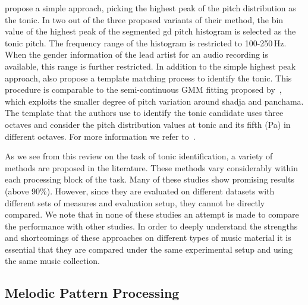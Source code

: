 \cite{Ashwin_Istanbul2012} propose a simple approach, picking the highest peak of the pitch distribution as the tonic. In two out of the three proposed variants of their method, the bin value of the highest peak of the segmented \gls{gd} pitch histogram is selected as the tonic pitch. The frequency range of the histogram is restricted to 100-250\,Hz. When the gender information of the lead artist for an audio recording is available, this range is further restricted. In addition to the simple highest peak approach, \cite{Ashwin_Istanbul2012} also propose a template matching process to identify the tonic. This procedure is comparable to the semi-continuous GMM fitting proposed by~\cite{ranjani2011carnatic}, which exploits the smaller degree of pitch variation around \gls{shadja} and \gls{panchama}. The template that the authors use to identify the tonic candidate uses three octaves and consider the pitch distribution values at tonic and its fifth (Pa) in different octaves. For more information we refer to~\cite{Gulati2014Tonic}.

As we see from this review on the task of tonic identification, a variety of methods are proposed in the literature. These methods vary considerably within each processing block of the task. Many of these studies show promising results (above 90\%). However, since they are evaluated on different datasets with different sets of measures and evaluation setup, they cannot be directly compared.  We note that in none of these studies an attempt is made to compare the performance with other studies. In order to deeply understand the strengths and shortcomings of these approaches on different types of music material it is essential that they are compared under the same experimental setup and using the same music collection. 


\subsection{Melodic Pattern Processing}
\label{sec:sota_pattern_processing_iam}

